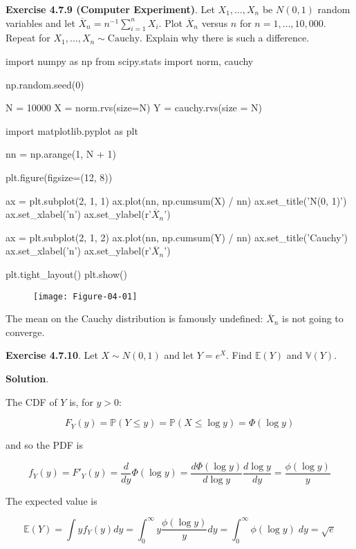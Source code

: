 \textbf{Exercise 4.7.9 (Computer Experiment)}. Let \(X_1, \dots, X_n\)
be \(N(0, 1)\) random variables and let
\(\overline{X}_n = n^{-1} \sum_{i=1}^n X_i\). Plot \(\overline{X}_n\)
versus \(n\) for \(n = 1, \dots, 10,000\). Repeat for
\(X_1, \dots, X_n \sim \text{Cauchy}\). Explain why there is such a
difference.

\begin{python}
import numpy as np
from scipy.stats import norm, cauchy

np.random.seed(0)

N = 10000
X = norm.rvs(size=N)
Y = cauchy.rvs(size = N)
\end{python}

\begin{python}
import matplotlib.pyplot as plt

nn = np.arange(1, N + 1)

plt.figure(figsize=(12, 8))

ax = plt.subplot(2, 1, 1)
ax.plot(nn, np.cumsum(X) / nn)
ax.set_title('N(0, 1)')
ax.set_xlabel('n')
ax.set_ylabel(r'$\overline{X}_n$')

ax = plt.subplot(2, 1, 2)
ax.plot(nn, np.cumsum(Y) / nn)
ax.set_title('Cauchy')
ax.set_xlabel('n')
ax.set_ylabel(r'$\overline{X}_n$')

plt.tight_layout()
plt.show()
\end{python}

\begin{figure}[H]
\texttt{[image: Figure-04-01]}
\end{figure}

The mean on the Cauchy distribution is famously undefined:
\(\overline{X}_ n\) is not going to converge.

\textbf{Exercise 4.7.10}. Let \(X \sim N(0, 1)\) and let \(Y = e^X\).
Find \(\mathbb{E}(Y)\) and \(\mathbb{V}(Y)\).

\textbf{Solution}.

The CDF of \(Y\) is, for \(y > 0\):

\[ F_Y(y) = \mathbb{P}(Y \leq y) = \mathbb{P}(X \leq \log y) = \Phi(\log y) \]

and so the PDF is

\[ f_Y(y) = F'_Y(y) = \frac{d}{dy} \Phi(\log y) = \frac{d \Phi(\log y)}{d \log y} \frac{d \log y}{dy} = \frac{\phi(\log y)}{y}\]

The expected value is

\[ \mathbb{E}(Y) = \int y f_Y(y) dy = \int_0^\infty y \frac{\phi(\log y)}{y} dy = \int_0^\infty \phi(\log y)\; dy = \sqrt{e}\]

